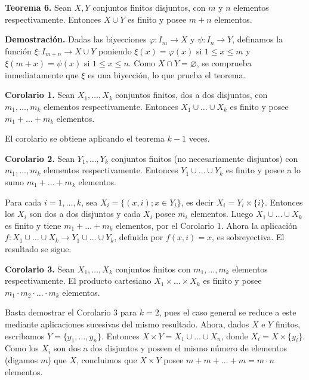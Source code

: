 \textbf{Teorema 6.} Sean \( X, Y \) conjuntos finitos disjuntos, con \( m \) y \( n \) elementos respectivamente. Entonces \( X \cup Y \) es finito y posee \( m + n \) elementos.

\textbf{Demostración.} Dadas las biyecciones \( \varphi: I_m \to X \) y \( \psi: I_n \to Y \), definamos la función \( \xi: I_{m+n} \to X \cup Y \) poniendo \( \xi(x) = \varphi(x) \) si \( 1 \leq x \leq m \) y \( \xi(m + x) = \psi(x) \) si \( 1 \leq x \leq n \). Como \( X \cap Y = \varnothing \), se comprueba inmediatamente que \( \xi \) es una biyección, lo que prueba el teorema.

\textbf{Corolario 1.} Sean \( X_1, \dots, X_k \) conjuntos finitos, dos a dos disjuntos, con \( m_1, \dots, m_k \) elementos respectivamente. Entonces \( X_1 \cup \dots \cup X_k \) es finito y posee \( m_1 + \dots + m_k \) elementos.

El corolario se obtiene aplicando el teorema \( k-1 \) veces.

\textbf{Corolario 2.} Sean \( Y_1, \dots, Y_k \) conjuntos finitos (no necesariamente disjuntos) con \( m_1, \dots, m_k \) elementos respectivamente. Entonces \( Y_1 \cup \dots \cup Y_k \) es finito y posee a lo sumo \( m_1 + \dots + m_k \) elementos.

Para cada \( i = 1, \dots, k \), sea \( X_i = \{(x, i) ; x \in Y_i\} \), es decir \( X_i = Y_i \times \{i\} \). Entonces los \( X_i \) son dos a dos disjuntos y cada \( X_i \) posee \( m_i \) elementos. Luego \( X_1 \cup \dots \cup X_k \) es finito y tiene \( m_1 + \dots + m_k \) elementos, por el Corolario 1. Ahora la aplicación \( f: X_1 \cup \dots \cup X_k \to Y_1 \cup \dots \cup Y_k \), definida por \( f(x, i) = x \), es sobreyectiva. El resultado se sigue.

\textbf{Corolario 3.} Sean \( X_1, \dots, X_k \) conjuntos finitos con \( m_1, \dots, m_k \) elementos respectivamente. El producto cartesiano \( X_1 \times \dots \times X_k \) es finito y posee \( m_1 \cdot m_2 \cdot \dots \cdot m_k \) elementos.

Basta demostrar el Corolario 3 para \( k = 2 \), pues el caso general se reduce a este mediante aplicaciones sucesivas del mismo resultado. Ahora, dados \( X \) e \( Y \) finitos, escribamos \( Y = \{y_1, \dots, y_n\} \). Entonces \( X \times Y = X_1 \cup \dots \cup X_n \), donde \( X_i = X \times \{y_i\} \). Como los \( X_i \) son dos a dos disjuntos y poseen el mismo número de elementos (digamos \( m \)) que \( X \), concluimos que \( X \times Y \) posee \( m + m + \dots + m = m \cdot n \) elementos.

